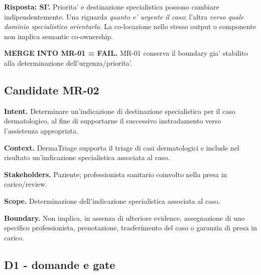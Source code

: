 \documentclass[11pt,a4paper]{article}
\begin{document}
\textbf{Risposta: SI'.} Priorita' e destinazione specialistica possono cambiare indipendentemente. Una riguarda \emph{quanto e' urgente il caso}; l'altra \emph{verso quale dominio specialistico orientarlo}. La co-locazione nello stesso output o componente non implica semantic co-ownership.

\begin{ddtaanti}[title={Merge disposition}]
\textbf{MERGE INTO MR-01 = FAIL.} MR-01 conserva il boundary gia' stabilito alla determinazione dell'urgenza/priorita'.
\end{ddtaanti}

\subsection{Candidate MR-02}

\begin{ddtacore}[title={MR-02 - Indirizzamento specialistico del caso dermatologico}]
\textbf{Intent.} Determinare un'indicazione di destinazione specialistica per il caso dermatologico, al fine di supportarne il successivo instradamento verso l'assistenza appropriata.

\textbf{Context.} DermaTriage supporta il triage di casi dermatologici e include nel risultato un'indicazione specialistica associata al caso.

\textbf{Stakeholders.} Paziente; professionista sanitario coinvolto nella presa in carico/review.

\textbf{Scope.} Determinazione dell'indicazione specialistica associata al caso.

\textbf{Boundary.} Non implica, in assenza di ulteriore evidence, assegnazione di uno specifico professionista, prenotazione, trasferimento del caso o garanzia di presa in carico.
\end{ddtacore}

\subsection{D1 - domande e gate}
\end{document}
